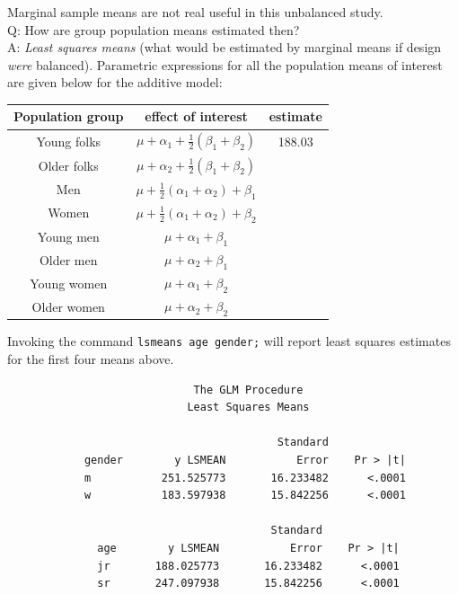 Marginal sample means are not real useful in this unbalanced study.
\\
Q: How are group population means estimated then?
\\
A: {\em Least squares means} (what would be estimated by marginal means
if design {\em were} 
balanced).  
\newpage
\noindent
Parametric expressions for all the population means of interest
are given below for the additive model:
\begin{center}
\begin{tabular}{c|c|c}
Population group & effect of interest& estimate \\ \hline
Young folks & $\mu + \alpha_1 + \frac{1}{2}(\beta_1 + \beta_2)$ &  188.03\\
Older folks & $\mu + \alpha_2 + \frac{1}{2}(\beta_1 + \beta_2)$ &  \\
Men & $\mu + \frac{1}{2}(\alpha_1 + \alpha_2) + \beta_1$ &  \\
Women & $\mu + \frac{1}{2}(\alpha_1 + \alpha_2) + \beta_2$ &  \\
Young men & $\mu + \alpha_1 + \beta_1$ & \\
Older men & $\mu + \alpha_2 + \beta_1$ & \\
Young women & $\mu + \alpha_1 + \beta_2$ & \\
Older women & $\mu + \alpha_2 + \beta_2$ & \\ \hline
\end{tabular}
\end{center}
\noindent
Invoking the command {\tt lsmeans age gender;} will report
least squares estimates for the first four means above.
\begin{large}
\begin{verbatim}
                             The GLM Procedure
                            Least Squares Means

                                          Standard
            gender        y LSMEAN           Error    Pr > |t|
            m           251.525773       16.233482      <.0001
            w           183.597938       15.842256      <.0001

                                         Standard
              age        y LSMEAN           Error    Pr > |t|
              jr       188.025773       16.233482      <.0001
              sr       247.097938       15.842256      <.0001
\end{verbatim}
\end{large}

